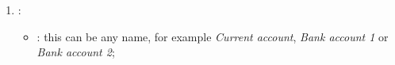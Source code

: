 \begin{enumerate}
	\item {}:
	\begin{itemize}
		\item {}: this can be any name, for example \emph{Current account}, \emph{Bank account 1} or \emph{Bank account 2};
		
		

\end{itemize}
\end{enumerate}
